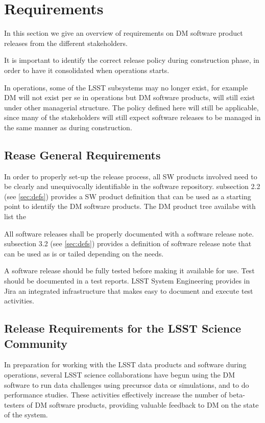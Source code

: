 \section{Requirements} \label{sec:reqs}

In this section we give an overview of requirements on \gls{DM} software product releases from the different stakeholders.

It is important to identify the correct release policy during construction phase, in order to have it consolidated when operations starts.

In operations, some of the \gls{LSST} subsystems may no longer exist, for example \gls{DM} will not exist per se in operations but \gls{DM} software products, will still exist under other managerial structure.
The policy defined here will still be applicable, since many of the stakeholders will still expect software releases to be managed in the same manner as during construction.


\subsection{Rease General Requirements} \label{sec:genreq}

In order to properly set-up the release process, all \gls{SW} products involved need to be clearly and unequivocally identifiable in the software repository.
 subsection 2.2 (see \ref{sec:defs}) provides a SW product definition that can be used as a starting point to identify the DM software products.
The DM product tree availabe with  list the 

All software releases shall be properly documented with a software release note.
 subsection 3.2 (see \ref{sec:defs}) provides a definition of software release note that can be used as is or tailed depending on the needs.
 
A software release should be fully tested before making it available for use.
Test should be documented in a test reports.
LSST System Engineering provides in Jira an integrated infrastructure that makes easy to document and execute test activities.


\subsection{Release Requirements for the \gls{LSST} Science Community} \label{sec:comreqs}

In preparation for working with the \gls{LSST} data products and software during operations, several \gls{LSST} science collaborations have begun using the \gls{DM} software to run data challenges using precursor data or simulations, and to do performance studies. These activities effectively increase the number of beta-testers of \gls{DM} software products, providing valuable feedback to \gls{DM} on the state of the system. 


